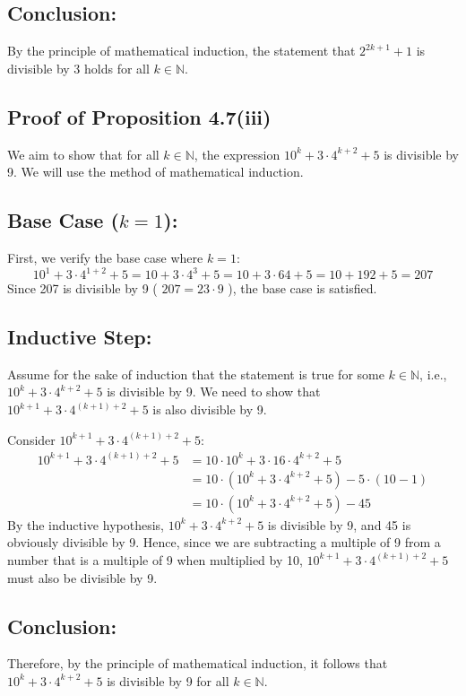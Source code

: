 \documentclass[12pt]{article}
\begin{document}
\subsection*{Conclusion:}
By the principle of mathematical induction, the statement that \( 2^{2k+1} + 1 \) is divisible by 3 holds for all \( k \in \mathbb{N} \).

\subsection*{Proof of Proposition 4.7(iii)}

We aim to show that for all \( k \in \mathbb{N} \), the expression \( 10^k + 3\cdot4^{k+2} + 5 \) is divisible by 9. We will use the method of mathematical induction.

\subsection*{Base Case (\(k=1\)):}
First, we verify the base case where \( k = 1 \):
\[ 10^1 + 3\cdot4^{1+2} + 5 = 10 + 3\cdot4^3 + 5 = 10 + 3\cdot64 + 5 = 10 + 192 + 5 = 207 \]
Since 207 is divisible by 9 ( \( 207 = 23 \cdot 9 \) ), the base case is satisfied.

\subsection*{Inductive Step:}
Assume for the sake of induction that the statement is true for some \( k \in \mathbb{N} \), i.e., \( 10^k + 3\cdot4^{k+2} + 5 \) is divisible by 9. We need to show that \( 10^{k+1} + 3\cdot4^{(k+1)+2} + 5 \) is also divisible by 9.

Consider \( 10^{k+1} + 3\cdot4^{(k+1)+2} + 5 \):
\begin{align*}
10^{k+1} + 3\cdot4^{(k+1)+2} + 5 &= 10\cdot10^k + 3\cdot16\cdot4^{k+2} + 5 \\
                                 &= 10\cdot(10^k + 3\cdot4^{k+2} + 5) - 5\cdot(10 - 1) \\
                                 &= 10\cdot(10^k + 3\cdot4^{k+2} + 5) - 45
\end{align*}
By the inductive hypothesis, \( 10^k + 3\cdot4^{k+2} + 5 \) is divisible by 9, and 45 is obviously divisible by 9. Hence, since we are subtracting a multiple of 9 from a number that is a multiple of 9 when multiplied by 10, \( 10^{k+1} + 3\cdot4^{(k+1)+2} + 5 \) must also be divisible by 9.

\subsection*{Conclusion:}
Therefore, by the principle of mathematical induction, it follows that \( 10^k + 3\cdot4^{k+2} + 5 \) is divisible by 9 for all \( k \in \mathbb{N} \).
\end{document}
